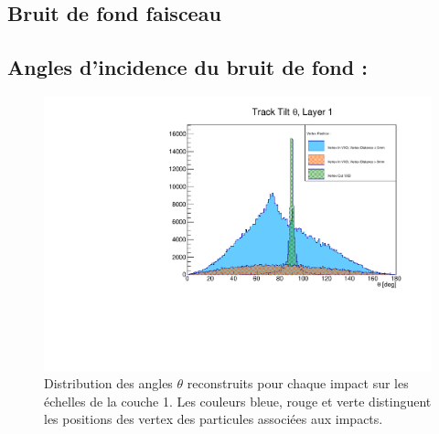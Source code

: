 \begin{appendices}
% 
% 

\chapter{Bruit de fond faisceau}

\section{Angles d'incidence du bruit de fond :}
\label{annexe:angles_incidence}
  
  \begin{figure}[!htb]
    \centering
    \includegraphics[scale=0.58]{./figures/Track_Tilts_Beamstrahlung/beamstrahlung_Theta/Track_Tilts_Theta_Layer1.pdf}
    \caption{Distribution des angles $\theta$ reconstruits pour chaque impact sur les \'echelles de la couche 1. Les couleurs bleue, rouge et verte distinguent les positions des vertex des particules associ\'ees aux impacts.}
    \label{fig:theta_Layer1}
  \end{figure}  
    

\end{appendices}
